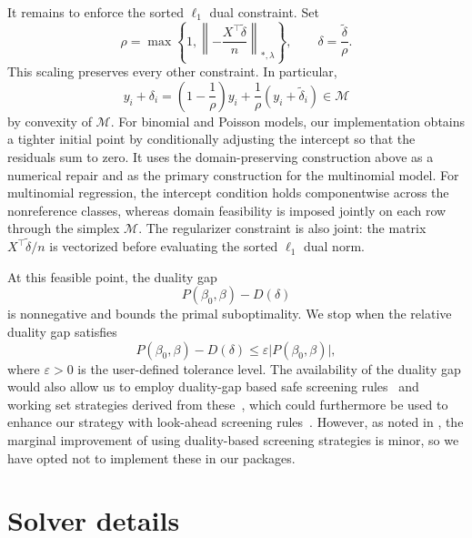 \documentclass[a4paper,fleqn]{cas-sc}
\begin{document}
It remains to enforce the sorted \(\ell_1\) dual constraint. Set
\[
  \rho = \max\left\{ 1, \left\lVert -\frac{X^\intercal\widetilde\delta}{n} \right\rVert_{*,\lambda} \right\}, \qquad \delta
       = \frac{\widetilde\delta}{\rho}.
\]
This scaling preserves every other constraint. In particular,
\[
  y_i + \delta_i =   \left( 1 - \frac{1}{\rho} \right)y_i
                     + \frac{1}{\rho}(y_i + \widetilde\delta_i)
                 \in \mathcal{M}
\]
by convexity of \(\mathcal{M}\). For binomial and Poisson models, our
implementation obtains a tighter initial point by conditionally adjusting the
intercept so that the residuals sum to zero. It uses the domain-preserving
construction above as a numerical repair and as the primary construction for the
multinomial model. For multinomial regression, the intercept condition holds
componentwise across the nonreference classes, whereas domain feasibility is
imposed jointly on each row through the simplex \(\mathcal{M}\). The regularizer
constraint is also joint: the matrix \(X^\intercal\widetilde\delta/n\) is
vectorized before evaluating the sorted \(\ell_1\) dual norm.

At this feasible point, the duality gap
\[
  P(\beta_0,\beta) - D(\delta)
\]
is nonnegative and bounds the primal suboptimality. We stop when the relative
duality gap satisfies
\[
  P(\beta_0,\beta) - D(\delta) \leq \varepsilon\lvert P(\beta_0,\beta)\rvert,
\]
where \(\varepsilon > 0\) is the user-defined tolerance level. The availability
of the duality gap would also allow us to employ duality-gap based safe
screening rules~\citep{fercoq2015} and working set strategies derived from
these~\citep{massias2018}, which could furthermore be used to enhance our
strategy with look-ahead screening rules~\citep{larsson2021a}. However, as noted
in \citet{larsson2022d}, the marginal improvement of using duality-based
screening strategies is minor, so we have opted not to implement these in our
packages.

\section{Solver details}
\label{sec:solver-details}
\end{document}
